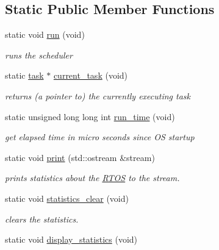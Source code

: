 \subsection*{Static Public Member Functions}
\begin{DoxyCompactItemize}
\item 
static void \hyperlink{class_r_t_o_s_a27731fa3169d3337e826ff0c9994c384}{run} (void)\hypertarget{class_r_t_o_s_a27731fa3169d3337e826ff0c9994c384}{}\label{class_r_t_o_s_a27731fa3169d3337e826ff0c9994c384}

\begin{DoxyCompactList}\small\item\em runs the scheduler \end{DoxyCompactList}\item 
static \hyperlink{class_r_t_o_s_1_1task}{task} $\ast$ \hyperlink{class_r_t_o_s_a7e455e2e010e6af8f9f41cbeacfe6bd0}{current\+\_\+task} (void)\hypertarget{class_r_t_o_s_a7e455e2e010e6af8f9f41cbeacfe6bd0}{}\label{class_r_t_o_s_a7e455e2e010e6af8f9f41cbeacfe6bd0}

\begin{DoxyCompactList}\small\item\em returns (a pointer to) the currently executing task \end{DoxyCompactList}\item 
static unsigned long long int \hyperlink{class_r_t_o_s_a543dc322355f7277b027a3120ca13853}{run\+\_\+time} (void)\hypertarget{class_r_t_o_s_a543dc322355f7277b027a3120ca13853}{}\label{class_r_t_o_s_a543dc322355f7277b027a3120ca13853}

\begin{DoxyCompactList}\small\item\em get elapsed time in micro seconds since OS startup \end{DoxyCompactList}\item 
static void \hyperlink{class_r_t_o_s_a93b6c76a8ddc42126f9996d9c63168b8}{print} (std\+::ostream \&stream)\hypertarget{class_r_t_o_s_a93b6c76a8ddc42126f9996d9c63168b8}{}\label{class_r_t_o_s_a93b6c76a8ddc42126f9996d9c63168b8}

\begin{DoxyCompactList}\small\item\em prints statistics about the \hyperlink{class_r_t_o_s}{R\+T\+OS} to the stream. \end{DoxyCompactList}\item 
static void \hyperlink{class_r_t_o_s_aa9b2602178a340b2ad59ca82d4b09b5e}{statistics\+\_\+clear} (void)
\begin{DoxyCompactList}\small\item\em clears the statistics. \end{DoxyCompactList}\item 
static void \hyperlink{class_r_t_o_s_ace9fc0f1b35c1383b1050222706f3b70}{display\+\_\+statistics} (void)\hypertarget{class_r_t_o_s_ace9fc0f1b35c1383b1050222706f3b70}{}\label{class_r_t_o_s_ace9fc0f1b35c1383b1050222706f3b70}


\end{DoxyCompactItemize}

